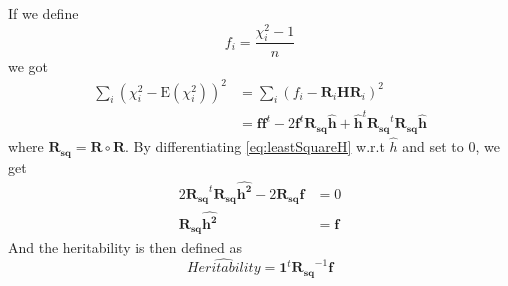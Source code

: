 			If we define 
			\begin{equation}
			f_i= \frac{\chi_i^2-1}{n}
			\label{eq:defineF}
			\end{equation}
			we got
			\begin{align}
			\sum_i(\chi_i^2-\mathrm{E}(\chi_i^2))^2&=\sum_i(f_i-\boldsymbol{R}_i\boldsymbol{H}\boldsymbol{R}_i)^2 \nonumber\\
			&=\boldsymbol{ff}^t-2\boldsymbol{f}^t\boldsymbol{R_{sq}\hat{h}}+\boldsymbol{\hat{h}}^t\boldsymbol{R_{sq}}^t\boldsymbol{R_{sq}\hat{h}}
			\label{eq:leastSquareH}
			\end{align}
			where $\boldsymbol{R_{sq}} = \boldsymbol{R}\circ\boldsymbol{R}$.
			By differentiating \cref{eq:leastSquareH} w.r.t $\hat{h}$ and set to 0, we get
			\begin{align}
				2\boldsymbol{R_{sq}}^t\boldsymbol{R_{sq}}\boldsymbol{\hat{h^2}}-2\boldsymbol{R_{sq}f}&=0 \nonumber\\
				\boldsymbol{R_{sq}}\boldsymbol{\hat{h^2}} &=\boldsymbol{f}
				\label{eq:shrekEq}
			\end{align}
			And the heritability is then defined as 
			\begin{equation}
			\hat{Heritability} = \boldsymbol{1}^t\boldsymbol{R_{sq}}^{-1}\boldsymbol{f}
			\label{eq:fullShrek}
			\end{equation}
